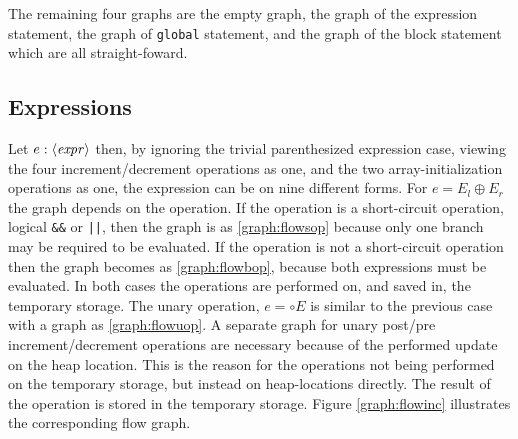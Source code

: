 The remaining four graphs are the empty graph, the graph of the expression statement, the graph of \texttt{global} statement, and the graph of the block statement which are all straight-foward.


\subsection{Expressions}

Let $e : \langle\mathit{expr}\rangle$ then, by ignoring the trivial parenthesized expression case, viewing the four increment/decrement operations as one, and the two array-initialization operations as one, the expression can be on nine different forms. For $e = E_l \oplus E_r$ the graph depends on the operation. If the operation is a short-circuit operation, logical \texttt{\&\&} or \texttt{||}, then the graph is as \ref{graph:flowsop} because only one branch may be required to be evaluated. If the operation is not a short-circuit operation then the graph becomes as \ref{graph:flowbop}, because both expressions must be evaluated. In both cases the operations are performed on, and saved in, the temporary storage. The unary operation, $e = \circ E$ is similar to the previous case with a graph as \ref{graph:flowuop}. A separate graph for unary post/pre increment/decrement operations are necessary because of the performed update on the heap location. This is the reason for the operations not being performed on the temporary storage, but instead on heap-locations directly. The result of the operation is stored in the temporary storage. Figure \ref{graph:flowinc} illustrates the corresponding flow graph.
